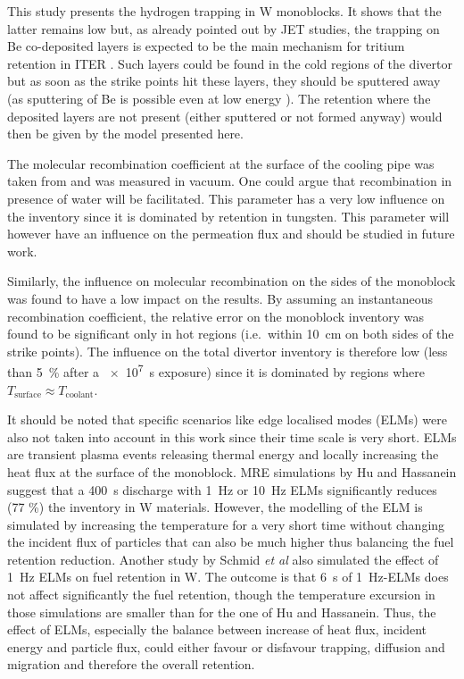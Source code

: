 This study presents the hydrogen trapping in W monoblocks.
It shows that the latter remains low but, as already pointed out by JET studies, the trapping on Be co-deposited layers is expected to be the main mechanism for tritium retention in ITER .
Such layers could be found in the cold regions of the divertor but as soon as the strike points hit these layers, they should be sputtered away (as sputtering of Be is possible even at low energy \cite{bjorkas_variables_2013, brezinsek_beryllium_2015}).
The retention where the deposited layers are not present (either sputtered or not formed anyway) would then be given by the model presented here.

The molecular recombination coefficient at the surface of the cooling pipe was taken from  and was measured in vacuum.
One could argue that recombination in presence of water will be facilitated.
This parameter has a very low influence on the inventory since it is dominated by retention in tungsten.
This parameter will however have an influence on the permeation flux and should be studied in future work.

Similarly, the influence on molecular recombination on the sides of the monoblock was found to have a low impact on the results.
By assuming an instantaneous recombination coefficient, the relative error on the monoblock inventory was found to be significant only in hot regions (i.e.\ within \SI{10}{cm} on both sides of the strike points).
The influence on the total divertor inventory is therefore low (less than \SI{5}{\%} after a \SI{e7}{s} exposure) since it is dominated by regions where $T_\mathrm{surface} \approx T_\mathrm{coolant}$.

It should be noted that specific scenarios like edge localised modes (ELMs) were also not taken into account in this work since their time scale is very short.
ELMs are transient plasma events releasing thermal energy and locally increasing the heat flux at the surface of the monoblock.
MRE simulations by Hu and Hassanein  suggest that a \SI{400}{s} discharge with \SI{1}{Hz} or \SI{10}{Hz} ELMs significantly reduces (77 \%) the inventory in W materials.
However, the modelling of the ELM is simulated by increasing the temperature for a very short time without changing the incident flux of particles that can also be much higher thus balancing the fuel retention reduction.
Another study by Schmid \textit{et al}  also simulated the effect of \SI{1}{Hz} ELMs on fuel retention in W.
The outcome is that \SI{6}{s} of \SI{1}{Hz}-ELMs does not affect significantly the fuel retention, though the temperature excursion in those simulations are smaller than for the one of Hu and Hassanein.
Thus, the effect of ELMs, especially the balance between increase of heat flux, incident energy and particle flux, could either favour or disfavour trapping, diffusion and migration and therefore the overall retention.

